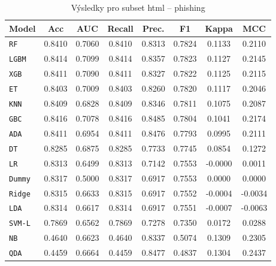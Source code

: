 \begin{table}[H]
  \centering
  \small
  \caption{Výsledky pro subset html – phishing}
  \begin{tabular}{|l|c|c|c|c|c|c|c|}
    \hline
    \textbf{Model} & \textbf{Acc} & \textbf{AUC} & \textbf{Recall} & \textbf{Prec.} & \textbf{F1} & \textbf{Kappa} & \textbf{MCC} \\
    \hline
    \texttt{RF} & 0.8410 & 0.7060 & 0.8410 & 0.8313 & 0.7824 & 0.1133 & 0.2110 \\
    \texttt{LGBM} & 0.8414 & 0.7099 & 0.8414 & 0.8357 & 0.7823 & 0.1127 & 0.2145 \\
    \texttt{XGB} & 0.8411 & 0.7090 & 0.8411 & 0.8327 & 0.7822 & 0.1125 & 0.2115 \\
    \texttt{ET} & 0.8403 & 0.7009 & 0.8403 & 0.8260 & 0.7820 & 0.1117 & 0.2046 \\
    \texttt{KNN} & 0.8409 & 0.6828 & 0.8409 & 0.8346 & 0.7811 & 0.1075 & 0.2087 \\
    \texttt{GBC} & 0.8416 & 0.7078 & 0.8416 & 0.8485 & 0.7804 & 0.1041 & 0.2174 \\
    \texttt{ADA} & 0.8411 & 0.6954 & 0.8411 & 0.8476 & 0.7793 & 0.0995 & 0.2111 \\
    \texttt{DT} & 0.8285 & 0.6875 & 0.8285 & 0.7733 & 0.7745 & 0.0854 & 0.1272 \\
    \texttt{LR} & 0.8313 & 0.6499 & 0.8313 & 0.7142 & 0.7553 & -0.0000 & 0.0011 \\
    \texttt{Dummy} & 0.8317 & 0.5000 & 0.8317 & 0.6917 & 0.7553 & 0.0000 & 0.0000 \\
    \texttt{Ridge} & 0.8315 & 0.6633 & 0.8315 & 0.6917 & 0.7552 & -0.0004 & -0.0034 \\
    \texttt{LDA} & 0.8314 & 0.6617 & 0.8314 & 0.6917 & 0.7551 & -0.0007 & -0.0063 \\
    \texttt{SVM-L} & 0.7869 & 0.6562 & 0.7869 & 0.7278 & 0.7350 & 0.0172 & 0.0288 \\
    \texttt{NB} & 0.4640 & 0.6623 & 0.4640 & 0.8337 & 0.5074 & 0.1309 & 0.2305 \\
    \texttt{QDA} & 0.4459 & 0.6664 & 0.4459 & 0.8477 & 0.4837 & 0.1304 & 0.2437 \\
    \hline
  \end{tabular}
\end{table}
\vspace{0.5cm}

